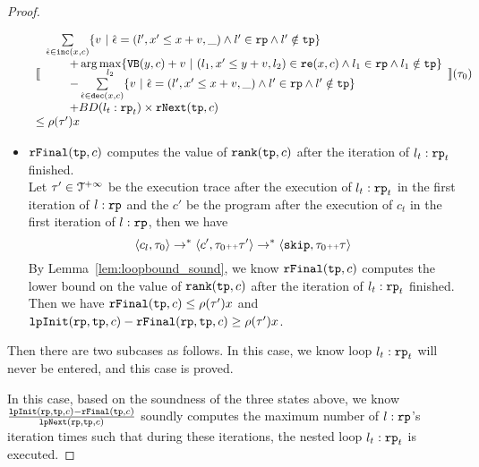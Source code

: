 \begin{proof}
\begin{itemize}
\[\begin{array}{l}
      \econfig{
          \begin{array}{l}
            \sum\limits_{\absevent \in \inc(x, c) }
            \left\{ 
            v ~\middle\vert~ \absevent = (l', x' \leq x + v, \_) \land  l' \in \rprog 
            \land l' \notin \tpath \right\}
            \\ \qquad 
            + \arg\max\limits_{l_2 }
                \left\{ \varinvar(y, c) + v ~\middle\vert~ 
                (l_1, x' \leq y + v, l_2) \in \reset(x, c) \land l_1 \in \rprog \land l_1 \notin \tpath\right\}
            \\ \qquad 
            - \sum\limits_{ \absevent \in \dec(x, c) }\left\{ 
            v 
            ~\middle\vert~ \absevent = (l', x' \leq x + v, \_) \land l' \in \rprog \land l' \notin \tpath \right\}
            \\ \qquad 
            + BD(l_t: \rprog_t) \times \rfnext(\tpath, c)
          \end{array}
      }(\trace_0) \\
      \leq \env(\trace') x
    \end{array}
    \]
  \item $\mathtt{rFinal}(\mathtt{tp}, c)$ computes the value of $\mathtt{rank}(\mathtt{tp}, c)$ after the iteration of $l_t:\mathtt{rp}_t$ finished.
  \\
  Let $\mathtt{\tau}' \in \mathcal{T}^{+\infty}$ be the execution trace after the execution of $l_t: \mathtt{rp}_t$ in the first iteration of $l:\mathtt{rp}$ and the $c'$ be the program after the execution of $c_t$ in the first iteration of $l:\mathtt{rp}$,  then we have
  \[
    \langle c_l, \mathtt{\tau}_0 \rangle \to^* \langle c', \mathtt{\tau}_0 {\scriptscriptstyle ++} \mathtt{\tau}' \rangle \to^* \langle \mathtt{skip}, \mathtt{\tau}_0 {\scriptscriptstyle ++} \mathtt{\tau} \rangle
  \]
  By Lemma~\ref{lem:loopbound_sound}, we know $\mathtt{rFinal}(\mathtt{tp}, c)$ computes the lower bound on the value of $\mathtt{rank}(\mathtt{tp}, c)$ after the iteration of $l_t:\mathtt{rp}_t$ finished.
  \\
  Then we have 
  $\mathtt{rFinal}(\mathtt{tp}, c) \leq \rho(\mathtt{\tau}') x$ and $\mathtt{lpInit}(\mathtt{rp}, \mathtt{tp}, c) - \mathtt{rFinal}(\mathtt{rp}, \mathtt{tp}, c) \geq \rho(\mathtt{\tau}') x$.
\end{itemize}
Then there are two subcases as follows.
In this case, we know loop $l_t: \mathtt{rp}_t$ will never be entered, and this case is proved.

In this case, based on the soundness of the three states above, we know 
$\frac{\mathtt{lpInit}(\mathtt{rp}, \mathtt{tp}, c) - \mathtt{rFinal}(\mathtt{tp}, c)}{\mathtt{lpNext}(\mathtt{rp}, \mathtt{tp}, c)}$ 
soundly computes the maximum number of $l: \mathtt{rp}$'s iteration times such that during these iterations, the nested loop $l_t: \mathtt{rp}_t$ is executed.


\end{proof}
